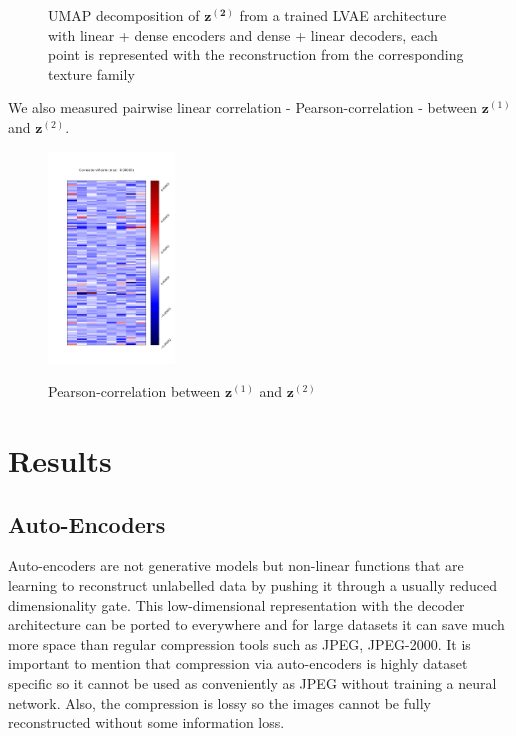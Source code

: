 \documentclass[12pt, english]{article}
\begin{document}
\begin{figure}[H]
\begin{minipage}{0.48\linewidth}
    \caption{UMAP decomposition of $\bm{z^{(2)}}$ from a trained LVAE architecture with linear + dense encoders and dense + linear decoders, each point is represented with the reconstruction from the corresponding texture family} 
    \label{fig:umap-z2-text}
  \end{minipage} 
\end{figure}

\vspace{4mm}

\par We also measured pairwise linear correlation - Pearson-correlation - between $\bm{z}^{(1)}$ and $\bm{z}^{(2)}$.

\vspace{4mm}

\begin{figure}[H]
    \centering
    \includegraphics[width=0.3\textwidth]{z1_z2_correlation.png}
    \label{fig:pearson-matrix}
    \caption{Pearson-correlation between $\bm{z}^{(1)}$ and $\bm{z}^{(2)}$}
\end{figure}

\newpage

\section{Results}

\vspace{7mm}

\subsection{Auto-Encoders}

\vspace{5mm}

\par Auto-encoders are not generative models but non-linear functions that are learning to reconstruct unlabelled data by pushing it through a usually reduced dimensionality gate. This low-dimensional representation with the decoder architecture can be ported to everywhere and for large datasets it can save much more space than regular compression tools such as JPEG, JPEG-2000. It is important to mention that compression via auto-encoders is highly dataset specific so it cannot be used as conveniently as JPEG without training a neural network. Also, the compression is lossy so the images cannot be fully reconstructed without some information loss.
\end{document}
